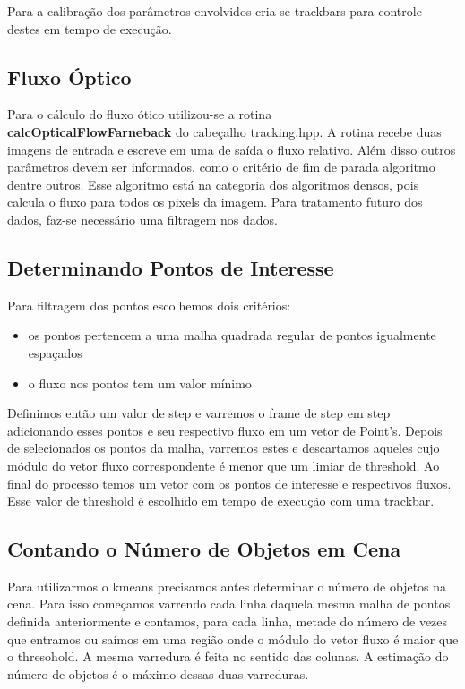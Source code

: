 \documentclass[journal]{IEEEtran}
\begin{document}
Para a calibração dos parâmetros envolvidos cria-se trackbars para 
controle destes em tempo de execução.

\newpage 
\subsection{Fluxo Óptico}

Para o cálculo do fluxo ótico utilizou-se a rotina \\ 
\textbf{calcOpticalFlowFarneback} do cabeçalho tracking.hpp. A rotina
recebe duas imagens de entrada e escreve em uma de saída o fluxo 
relativo. Além disso outros parâmetros devem ser informados, como o 
critério de fim de parada algoritmo dentre outros. Esse algoritmo 
está na categoria dos algoritmos densos, pois calcula o fluxo para 
todos os pixels da imagem. Para tratamento futuro dos dados, faz-se 
necessário uma filtragem nos dados.

\subsection{Determinando Pontos de Interesse}
Para filtragem dos pontos escolhemos dois critérios:
\begin{itemize}
 \item os pontos pertencem a uma malha quadrada regular de pontos 
igualmente espaçados
  \item o fluxo nos pontos tem um valor mínimo
\end{itemize}
Definimos então um valor de step e varremos o frame de step em step 
adicionando esses pontos e seu respectivo fluxo em um vetor de 
Point's. Depois de selecionados os pontos da malha, varremos estes e 
descartamos aqueles cujo módulo do vetor fluxo correspondente é menor 
que um limiar de threshold. Ao final do processo temos um vetor com 
os pontos de interesse e respectivos fluxos. Esse valor de threshold 
é escolhido em tempo de execução com uma trackbar.

\subsection{Contando o Número de Objetos em Cena}
Para utilizarmos o kmeans precisamos antes determinar o número de 
objetos na cena. Para isso começamos varrendo cada linha daquela 
mesma malha de pontos definida anteriormente e contamos, para cada 
linha, metade do número de vezes que entramos ou saímos em uma região 
onde o módulo do vetor fluxo é maior que o thresohold. A mesma 
varredura é feita no sentido das colunas. A estimação do 
número de objetos é o máximo dessas duas varreduras.
\end{document}
